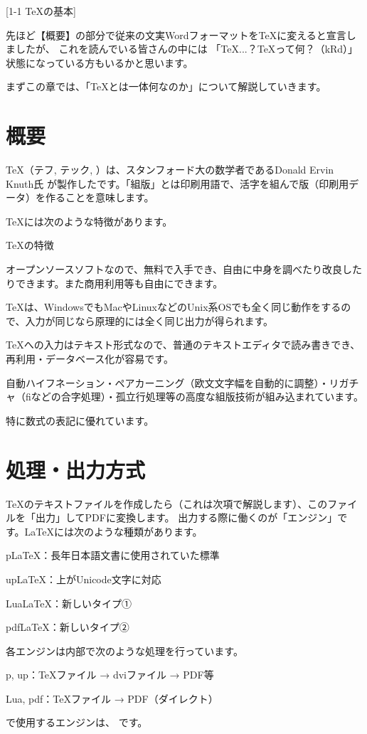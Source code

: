 \newpage
\pagestyle{booklet}
[1-1 \TeX の基本]
\begin{multicols*}{2}
先ほど【概要】の部分で従来の文実Wordフォーマットを\TeX に変えると宣言しましたが、
これを読んでいる皆さんの中には
「\TeX ...？\TeX って何？（kRd）」状態になっている方もいるかと思います。

まずこの章では、「\TeX とは一体何なのか」について解説していきます。

\section{概要}
TeX（テフ, テック, ）は、スタンフォード大の数学者であるDonald Ervin Knuth氏
が製作したです。「組版」とは印刷用語で、活字を組んで版（印刷用データ）を作ることを意味します。

\TeX には次のような特徴があります。
\begin{framebox-simple}{\TeX の特徴}
    \begin{reitemize}
        \item オープンソースソフトなので、無料で入手でき、自由に中身を調べたり改良したりできます。また商用利用等も自由にできます。
        \item \TeX は、WindowsでもMacやLinuxなどのUnix系OSでも全く同じ動作をするので、入力が同じなら原理的には全く同じ出力が得られます。
        \item \TeX への入力はテキスト形式なので、普通のテキストエディタで読み書きでき、再利用・データベース化が容易です。
        \item 自動ハイフネーション・ペアカーニング（欧文文字幅を自動的に調整）・リガチャ（fiなどの合字処理）・孤立行処理等の高度な組版技術が組み込まれています。
        \item 特に数式の表記に優れています。
    \end{reitemize}
\end{framebox-simple}

\section{処理・出力方式}
\TeX のテキストファイルを作成したら（これは次項で解説します）、このファイルを「出力」してPDFに変換します。
出力する際に働くのが「エンジン」です。\LaTeX には次のような種類があります。
\begin{reitemize}
    \item p\LaTeX ：長年日本語文書に使用されていた標準
    \item up\LaTeX ：上がUnicode文字に対応
    \item Lua\LaTeX ：新しいタイプ①
    \item pdf\LaTeX ：新しいタイプ②
\end{reitemize}
\vspace{1\zw}
各エンジンは内部で次のような処理を行っています。
\begin{reitemize}
    \item p, up：\TeX ファイル → dviファイル → PDF等
    \item Lua, pdf：\TeX ファイル → PDF（ダイレクト）
\end{reitemize}
\BunTeX で使用するエンジンは、 です。


\end{multicols*}
